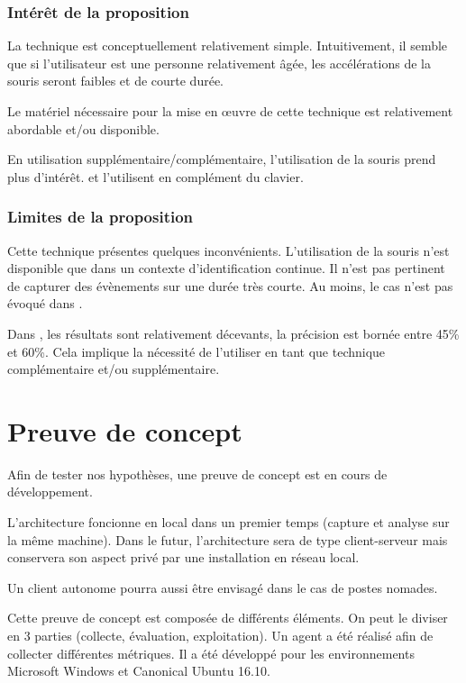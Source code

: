 \documentclass[conference,compsoc]{IEEEtran}
\begin{document}
\subsubsection{Intérêt de la proposition}
La technique est conceptuellement relativement simple. Intuitivement, il semble que si l'utilisateur est une personne relativement âgée, les accélérations de la souris seront faibles et de courte durée.

Le matériel nécessaire pour la mise en \oe{}uvre de cette technique est relativement abordable et/ou disponible.

En utilisation supplémentaire/complémentaire, l'utilisation de la souris prend plus d'intérêt. \cite{fridman2015multi} et \cite{7477228} l'utilisent en complément du clavier.

\subsubsection{Limites de la proposition}
Cette technique présentes quelques inconvénients. L'utilisation de la souris n'est disponible que dans un contexte d'identification continue. Il n'est pas pertinent de capturer des évènements sur une durée très courte. Au moins, le cas n'est pas évoqué dans \cite{7477228}.

Dans \cite{7477228}, les résultats sont relativement décevants, la précision est bornée entre 45\% et 60\%. Cela implique la nécessité de l'utiliser en tant que technique complémentaire et/ou supplémentaire.

\section{Preuve de concept}
Afin de tester nos hypothèses, une preuve de concept est en cours de développement.

 L'architecture foncionne en local dans un premier temps (capture et analyse sur la même machine). Dans le futur, l'architecture sera de type client-serveur mais conservera son aspect privé par une installation en réseau local.

 Un client autonome pourra aussi être envisagé dans le cas de postes nomades.

 Cette preuve de concept est composée de différents éléments. On peut le diviser en 3 parties (collecte, évaluation, exploitation). Un agent a été réalisé afin de collecter différentes métriques.
 Il a été développé pour les environnements Microsoft Windows et Canonical Ubuntu 16.10.
\end{document}
